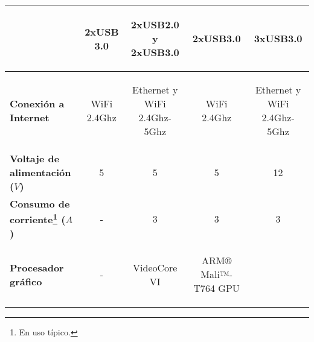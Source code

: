 \begin{savenotes}
\begin{mytable}[H]
\begin{tabular}{l|c|c|c|c|}
{			} & 2xUSB 3.0 & 
			\begin{minipage}{\mythirdmaxsizeofcontenttable}\begin{myflushcenterinsidetable}
					2xUSB2.0 y 2xUSB3.0
			\end{myflushcenterinsidetable}\end{minipage}
			& 2xUSB3.0 & 3xUSB3.0 \\ \hline	
			\multicolumn{1}{|l|}{
				\begin{minipage}{\myforthmaxsizeofcontenttable}	
					\textbf{Conexión a Internet}
				\end{minipage}
			} & WiFi 2.4Ghz & 
			\begin{minipage}{\mythirdmaxsizeofcontenttable}\begin{myflushcenterinsidetable}
					Ethernet y WiFi 2.4Ghz- 5Ghz
			\end{myflushcenterinsidetable}\end{minipage}
			& WiFi 2.4Ghz & 
			\begin{minipage}{\mythirdmaxsizeofcontenttable}\begin{myflushcenterinsidetable}
					Ethernet y WiFi 2.4Ghz- 5Ghz
			\end{myflushcenterinsidetable}\end{minipage} \\ \hline		
			\multicolumn{1}{|l|}{
				\begin{minipage}{\myforthmaxsizeofcontenttable}	
					\textbf{Voltaje de alimentación ($V$)}
				\end{minipage}
			} & 5 & 5 & 5 & 12 \\ \hline			
			\multicolumn{1}{|l|}{
				\begin{minipage}{\myforthmaxsizeofcontenttable}	
					\textbf{Consumo de corriente\footnote{En uso típico.} ($A$)}
				\end{minipage}
			} & - & 3 & 3 & 3 \\ \hline
			\multicolumn{1}{|l|}{
				\begin{minipage}{\myforthmaxsizeofcontenttable}	
					\textbf{Procesador gráfico}
				\end{minipage}
			} & - & VideoCore VI & 		
			\begin{minipage}{\mythirdmaxsizeofcontenttable}\begin{myflushcenterinsidetable}
					ARM® Mali™-T764 GPU
			\end{myflushcenterinsidetable}\end{minipage}
			&  		
			\begin{minipage}{\mythirdmaxsizeofcontenttable}\begin{myflushcenterinsidetable}

\end{myflushcenterinsidetable}
\end{minipage}
\end{tabular}
\end{mytable}
\end{savenotes}
